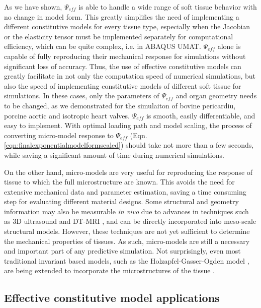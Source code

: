     
    As we have shown, $\Psi_{eff}$ is able to handle a wide range of soft tissue behavior with no change in model form. This greatly simplifies the need of implementing a different constitutive models for every tissue type, especially when the Jacobian or the elasticity tensor must be implemented separately for computational efficiency, which can be quite complex, i.e. in ABAQUS UMAT. $\Psi_{eff}$ alone is capable of fully reproducing their mechanical response for simulations without significant loss of accuracy. Thus, the use of effective constitutive models can greatly facilitate in not only the computation speed of numerical simulations, but also the speed of implementing constitutive models of different soft tissue for simulations. In these cases, only the parameters of $\Psi_{eff}$ and organ geometry needs to be changed, as we demonstrated for the simulaiton of bovine pericardiu, porcine aortic and isotropic heart valves. $\Psi_{eff}$ is smooth, easily differentiable, and easy to implement. With optimal loading path and model scaling, the process of converting micro-model response to $\Psi_{eff}$ (Eqn. \ref{eqn:finalexponentialmodelformscaled}) should take not more than a few seconds, while saving a significant amount of time during numerical simulations. 
    
    
    On the other hand, micro-models are very useful for reproducing the response of tissue to which the full microstructure are known. This avoids the need for extensive mechanical data and parameter estimation, saving a time consuming step for evaluating different material designs. Some structural and geometry information may also be measurable \textit{in vivo} due to advances in techniques such as 3D ultrasound \cite{steiner_diagnostic_1994, yang_3d_2008, fenster_3_1996} and DT-MRI \cite{basser_vivo_2000, basser_microstructural_2011}, and can be directly incorporated into meso-scale structural models. However, these techniques are not yet sufficient to determine the mechanical properties of tissues. As such, micro-models are still a necessary and important part of any predictive simulation. Not surprisingly, even most traditional invariant based models, such as the Holzapfel-Gasser-Ogden model \cite{holzapfel_new_2000}, are being extended to incorporate the microstructures of the tissue \cite{holzapfel_modelling_2015}. 
    
    

\subsection{Effective constitutive model applications}


